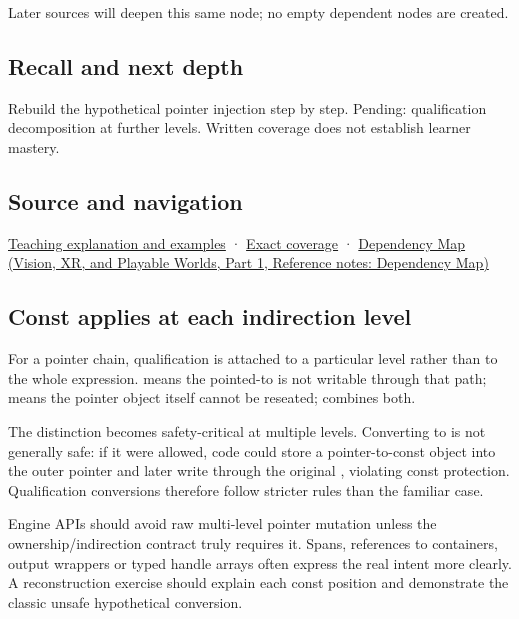Later sources will deepen this same node; no empty dependent nodes are created.

\subsection{Recall and next depth}\label{appendix-5e1a7561cd98-recall-and-next-depth}

\hypertarget{appendix-5e1a7561cd98-recall-and-next-depth}{}

Rebuild the hypothetical pointer injection step by step. Pending: qualification decomposition at further levels. Written coverage does not establish learner mastery.

\subsection{Source and navigation}\label{appendix-5e1a7561cd98-source-and-navigation}

\hypertarget{appendix-5e1a7561cd98-source-and-navigation}{}

\hyperref[01-foundations-i-ch003-read-only-is-a-path-not-an-ownership-or-synchronization-promise]{Teaching explanation and examples} · \hyperref[appendix-fd090d982a15-m008---parts-113-126]{Exact coverage} · \href{../07-Vision-XR-and-Playable-Worlds-P01/main.pdf\#nameddest=appendix-4ad47bdd269a}{Dependency Map (Vision, XR, and Playable Worlds, Part 1, Reference notes: Dependency Map)}

\subsection{Const applies at each indirection level}\label{appendix-5e1a7561cd98-const-applies-at-each-indirection-level}

\hypertarget{appendix-5e1a7561cd98-const-applies-at-each-indirection-level}{}

For a pointer chain, qualification is attached to a particular level rather than to the whole expression.  means the pointed-to  is not writable through that path;  means the pointer object itself cannot be reseated;  combines both.

The distinction becomes safety-critical at multiple levels. Converting  to  is not generally safe: if it were allowed, code could store a pointer-to-const object into the outer pointer and later write through the original , violating const protection. Qualification conversions therefore follow stricter rules than the familiar  case.

Engine APIs should avoid raw multi-level pointer mutation unless the ownership/indirection contract truly requires it. Spans, references to containers, output wrappers or typed handle arrays often express the real intent more clearly. A reconstruction exercise should explain each const position and demonstrate the classic unsafe hypothetical conversion.

